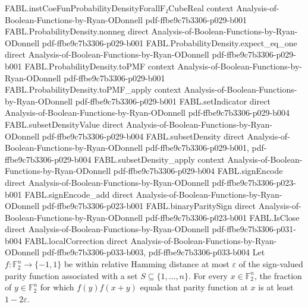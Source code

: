 \begin{theorem}
  {FABL.instCoeFunProbabilityDensityForallF₂CubeReal}
  {context}
  {Analysis-of-Boolean-Functions-by-Ryan-ODonnell}
  {pdf-ffbe9c7b3306-p029-b001}
\proofstep
  {FABL.ProbabilityDensity.nonneg}
  {direct}
  {Analysis-of-Boolean-Functions-by-Ryan-ODonnell}
  {pdf-ffbe9c7b3306-p029-b001}
\proofstep
  {FABL.ProbabilityDensity.expect_eq_one}
  {direct}
  {Analysis-of-Boolean-Functions-by-Ryan-ODonnell}
  {pdf-ffbe9c7b3306-p029-b001}
\proofstep
  {FABL.ProbabilityDensity.toPMF}
  {context}
  {Analysis-of-Boolean-Functions-by-Ryan-ODonnell}
  {pdf-ffbe9c7b3306-p029-b001}
\proofstep
  {FABL.ProbabilityDensity.toPMF_apply}
  {context}
  {Analysis-of-Boolean-Functions-by-Ryan-ODonnell}
  {pdf-ffbe9c7b3306-p029-b001}
\proofstep
  {FABL.setIndicator}
  {direct}
  {Analysis-of-Boolean-Functions-by-Ryan-ODonnell}
  {pdf-ffbe9c7b3306-p029-b004}
\proofstep
  {FABL.subsetDensityValue}
  {direct}
  {Analysis-of-Boolean-Functions-by-Ryan-ODonnell}
  {pdf-ffbe9c7b3306-p029-b004}
\proofstep
  {FABL.subsetDensity}
  {direct}
  {Analysis-of-Boolean-Functions-by-Ryan-ODonnell}
  {pdf-ffbe9c7b3306-p029-b001,
    pdf-ffbe9c7b3306-p029-b004}
\proofstep
  {FABL.subsetDensity_apply}
  {context}
  {Analysis-of-Boolean-Functions-by-Ryan-ODonnell}
  {pdf-ffbe9c7b3306-p029-b004}
\proofstep
  {FABL.signEncode}
  {direct}
  {Analysis-of-Boolean-Functions-by-Ryan-ODonnell}
  {pdf-ffbe9c7b3306-p023-b001}
\proofstep
  {FABL.signEncode_add}
  {direct}
  {Analysis-of-Boolean-Functions-by-Ryan-ODonnell}
  {pdf-ffbe9c7b3306-p023-b001}
\proofstep
  {FABL.binaryParitySign}
  {direct}
  {Analysis-of-Boolean-Functions-by-Ryan-ODonnell}
  {pdf-ffbe9c7b3306-p023-b001}
\proofstep
  {FABL.IsClose}
  {direct}
  {Analysis-of-Boolean-Functions-by-Ryan-ODonnell}
  {pdf-ffbe9c7b3306-p031-b004}
\proofstep
  {FABL.localCorrection}
  {direct}
  {Analysis-of-Boolean-Functions-by-Ryan-ODonnell}
  {pdf-ffbe9c7b3306-p033-b003,
    pdf-ffbe9c7b3306-p033-b004}
Let $f:\mathbb F_2^n\to\{-1,1\}$ be within relative Hamming distance at most
$\varepsilon$ of the sign-valued parity function associated with a set
$S\subseteq\{1,\ldots,n\}$. For every $x\in\mathbb F_2^n$, the fraction of $y\in\mathbb
F_2^n$ for which $f(y)f(x+y)$ equals that parity function at $x$ is at least
$1-2\varepsilon$.
\end{theorem}
